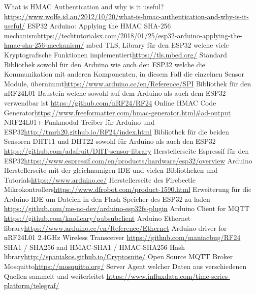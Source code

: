 \documentclass[
  12pt, %
  a4paper, %
  oneside, %
  openany, 
  numbers=noenddot, %
  BCOR=5mm, %
  parskip=half*, %
  thesis, %
]{bfhbook}
\begin{document}
\renewcommand\bibname{Linkverzeichnis}
\begin{thebibliography}{99}\label{links}
   What is HMAC Authentication and why is it useful?\break \url{https://www.wolfe.id.au/2012/10/20/what-is-hmac-authentication-and-why-is-it-useful/}
    ESP32 Arduino: Applying the HMAC SHA-256 mechanism\break \url{https://techtutorialsx.com/2018/01/25/esp32-arduino-applying-the-hmac-sha-256-mechanism/}
     mbed TLS, Library für den ESP32 welche viele Kryptografische Funktionen implementiert\break \url{https://tls.mbed.org/}
     Standard Bibliothek sowohl für den Arduino wie auch den ESP32 welche die Kommunikation mit anderen Komponenten, in diesem Fall die einzelnen Sensor Module, übernimmt\break \url{https://www.arduino.cc/en/Reference/SPI}
     Bibliothek für den nRF24L01 Baustein welche sowohl auf dem Arduino als auch dem ESP32 verwendbar ist \break \url{https://github.com/nRF24/RF24}
    Online HMAC Code Generator\break \url{https://www.freeformatter.com/hmac-generator.html#ad-output}
    NRF24L01+ Funkmodul Treiber für Arduino und ESP32\break \url{http://tmrh20.github.io/RF24/index.html}
     Bibliothek für die beiden Sensoren DHT11 und DHT22 sowohl für Arduino als auch den ESP32 \break \url{https://github.com/adafruit/DHT-sensor-library}
    Herstellerseite Espressif für den ESP32\break \url{https://www.espressif.com/en/products/hardware/esp32/overview}
    Arduino Herstellerseite mit der gleichnamigen IDE und vielen Bibliotheken und Tutorials\break \url{https://www.arduino.cc/}
    Herstellerseite des Firebeetle Mikrokontrollers\break \url{https://www.dfrobot.com/product-1590.html}
    Erweiterung für die Arduino IDE um Dateien in den Flash Speicher des ESP32 zu laden \break \url{https://github.com/me-no-dev/arduino-esp32fs-plugin}
    Arduino Client for MQTT \break \url{https://github.com/knolleary/pubsubclient}
    Arduino Ethernet library\break \url{https://www.arduino.cc/en/Reference/Ethernet}
    Arduino driver for nRF24L01 2.4GHz Wireless Transceiver \break \url{https://github.com/maniacbug/RF24}
    SHA1 / SHA256 and HMAC-SHA1 / HMAC-SHA256 Hash library\break \url{http://spaniakos.github.io/Cryptosuite/}
    Open Source MQTT Broker Mosquitto\break \url{https://mosquitto.org/}
     Server Agent welcher Daten aus verschiedenen Quellen sammelt und weiterleitet \break \url{https://www.influxdata.com/time-series-platform/telegraf/}

\end{thebibliography}
\end{document}
